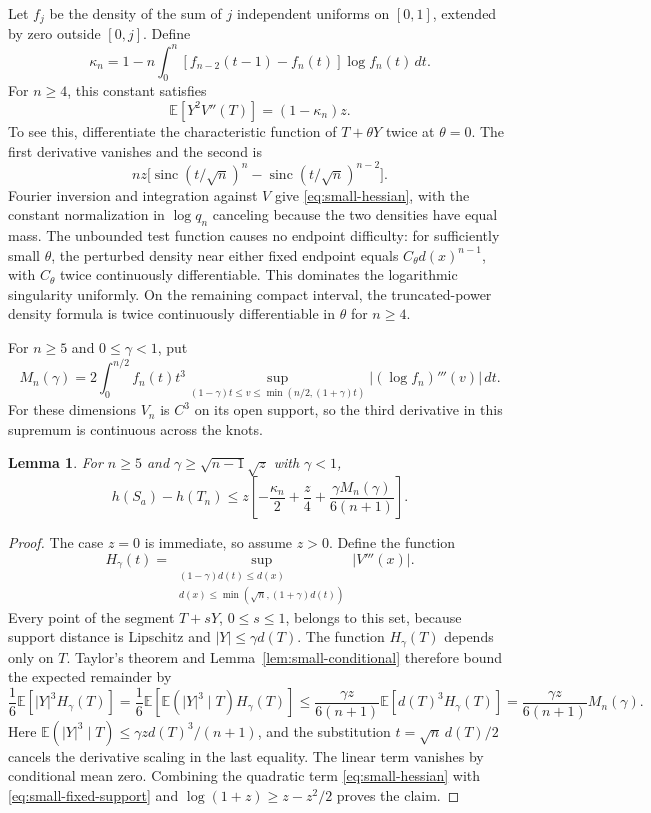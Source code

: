 \documentclass[11pt,a4paper]{article}
\newtheorem{lemma}[theorem]{Lemma}
\theoremstyle{remark}\newtheorem{remark}[theorem]{Remark}
\newcommand{\E}{\mathbb E}
\begin{document}
Let $f_j$ be the density of the sum of $j$ independent uniforms on $[0,1]$,
extended by zero outside $[0,j]$. Define
\begin{equation}\label{eq:small-kappa}
 \kappa_n=1-n\int_0^n[f_{n-2}(t-1)-f_n(t)]\log f_n(t)\,dt.
\end{equation}
For $n\ge4$, this constant satisfies
\begin{equation}\label{eq:small-hessian}
 \E[Y^2V''(T)]=(1-\kappa_n)z.
\end{equation}
To see this, differentiate the characteristic function of $T+\theta Y$
twice at $\theta=0$. The first derivative vanishes and the second is
\[
 nz\bigl[\operatorname{sinc}(t/\sqrt n)^n
             -\operatorname{sinc}(t/\sqrt n)^{n-2}\bigr].
\]
Fourier inversion and integration against $V$ give
\eqref{eq:small-hessian}, with the constant normalization in $\log q_n$
canceling because the two densities have equal mass. The unbounded test
function causes no endpoint difficulty: for sufficiently small $\theta$,
the perturbed density near either fixed endpoint equals
$C_\theta d(x)^{n-1}$, with $C_\theta$ twice continuously differentiable.
This dominates the logarithmic singularity uniformly. On the remaining
compact interval, the truncated-power density formula is twice
continuously differentiable in $\theta$ for $n\ge4$.

For $n\ge5$ and $0\le\gamma<1$, put
\[
 M_n(\gamma)=2\int_0^{n/2}f_n(t)t^3
  \sup_{(1-\gamma)t\le v\le\min(n/2,(1+\gamma)t)}
                |(\log f_n)'''(v)|\,dt.
\]
For these dimensions $V_n$ is $C^3$ on its open support, so the third
derivative in this supremum is continuous across the knots.

\begin{lemma}\label{lem:small-local}
For $n\ge5$ and $\gamma\ge\sqrt{n-1}\sqrt z$ with $\gamma<1$,
\[
 h(S_a)-h(T_n)
 \le z\left[-\frac{\kappa_n}{2}+\frac z4
                    +\frac{\gamma M_n(\gamma)}{6(n+1)}\right].
\]
\end{lemma}
\begin{proof}
The case $z=0$ is immediate, so assume $z>0$. Define the function
\[
 H_\gamma(t)=\sup_{\substack{(1-\gamma)d(t)\le d(x)\\
              d(x)\le\min(\sqrt n,(1+\gamma)d(t))}}|V'''(x)|.
\]
Every point of the segment $T+sY$, $0\le s\le1$, belongs to this set,
because support distance is Lipschitz and $|Y|\le\gamma d(T)$.
The function $H_\gamma(T)$ depends only on $T$. Taylor's theorem and
Lemma~\ref{lem:small-conditional} therefore bound the expected remainder by
\[
 \frac16\E[|Y|^3H_\gamma(T)]
 =\frac16\E[\E(|Y|^3\mid T)H_\gamma(T)]
 \le\frac{\gamma z}{6(n+1)}\E[d(T)^3H_\gamma(T)]
 =\frac{\gamma z}{6(n+1)}M_n(\gamma).
\]
Here $\E(|Y|^3\mid T)\le\gamma z d(T)^3/(n+1)$, and the substitution
$t=\sqrt n\,d(T)/2$ cancels the derivative scaling in the last equality.
The linear term
vanishes by conditional mean zero. Combining the quadratic term
\eqref{eq:small-hessian} with \eqref{eq:small-fixed-support} and
$\log(1+z)\ge z-z^2/2$ proves the claim.
\end{proof}
\end{document}
